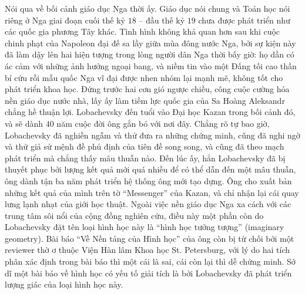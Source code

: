 \begin{multicols}{2}
	\vskip 0.1cm
	Nói qua về bối cảnh giáo dục Nga thời ấy. Giáo dục nói chung và Toán học nói riêng ở Nga giai đoạn cuối thế kỷ $18$ -- đầu thế kỷ $19$ chưa được phát triển như các quốc gia phương Tây khác. Tình hình không khả quan hơn sau khi cuộc chinh phạt của Napoleon đại đế sa lầy giữa mùa đông nước Nga, bởi sự kiện này đã làm dậy lên hai hiện tượng trong lòng người dân Nga thời bấy giờ: họ dần có ác cảm với những ảnh hưởng ngoại bang, và niềm tin vào một Đấng tối cao thần bí cứu rỗi mẫu quốc Nga vĩ đại được nhen nhóm lại mạnh mẽ, không tốt cho phát triển khoa học. Đứng trước hai cơn gió ngược chiều, công cuộc cường hóa nền giáo dục nước nhà, lấy ấy làm tiềm lực quốc gia của Sa Hoàng Aleksandr chẳng hề thuận lợi. Lobachevsky đến tuổi vào Đại học Kazan trong bối cảnh đó, và sẽ dành $40$ năm cuộc đời ông gắn bó với nơi đây.
	\vskip 0.01cm
	Chẳng rõ tự bao giờ, Lobachevsky đã nghiền ngẫm và thử đưa ra những chứng minh, cũng đã nghi ngờ và thử giả sử mệnh đề phủ định của tiên đề song song, và cũng đã theo mạch phát triển mà chẳng thấy mâu thuẫn nào. Đến lúc ấy, hẳn Lobachevsky đã bị thuyết phục bởi lượng kết quả mới quá nhiều để có thể dẫn đến một mâu thuẫn, ông dành tận ba năm phát triển hệ thống ông mới tạo dựng. Ông cho xuất bản những kết quả của mình trên tờ ``Messenger'' của Kazan, và chỉ nhận lại cái quay lưng lạnh nhạt của giới học thuật. Ngoài việc nền giáo dục Nga xa cách với các trung tâm sôi nổi của cộng đồng nghiên cứu, điều này một phần còn do Lobachevsky đặt tên loại hình học này là ``hình học tưởng tượng'' (imaginary geometry). Bài báo ``Về Nền tảng của Hình học'' của ông còn bị từ chối bởi một reviewer thờ ơ thuộc Viện Hàn lâm Khoa học St. Petersburg, với lý do hai tích phân xác định trong bài báo thì một cái là sai, cái còn lại thì dễ chứng minh. Sở dĩ một bài báo về hình học có yếu tố giải tích là bởi Lobachevsky đã phát triển lượng giác của loại hình học này.
	\end{multicols}
